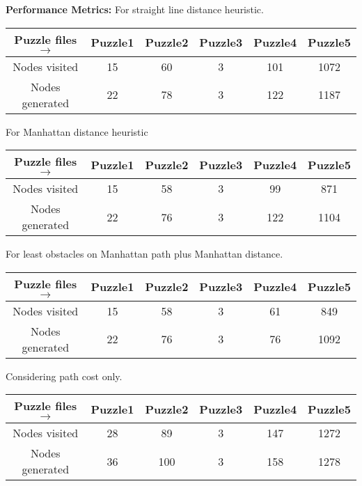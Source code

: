 \documentclass[12pt]{article}
\begin{document}
{\bf Performance Metrics:}
	\newline For straight line distance heuristic. \newline 
	\begin{tabular}{ | c | c | c | c | c | c | }
		\hline
			Puzzle files $\rightarrow$ & Puzzle1 & Puzzle2 & Puzzle3 & Puzzle4 & Puzzle5 \\ \hline
			Nodes visited &   15 & 60 & 3 & 101 & 1072 \\ \hline
			Nodes generated & 22 & 78 & 3 & 122 & 1187 \\ 
		\hline
	\end{tabular} \newline
	\newline For Manhattan distance heuristic \newline 
	\begin{tabular}{ | c | c | c | c | c | c | }
		\hline
			Puzzle files $\rightarrow$ & Puzzle1 & Puzzle2 & Puzzle3 & Puzzle4 & Puzzle5 \\ \hline
			Nodes visited &   15 & 58 & 3 & 99  & 871 \\ \hline
			Nodes generated & 22 & 76 & 3 & 122 & 1104 \\ 
		\hline
	\end{tabular} \newline
	\newline For least obstacles on Manhattan path plus Manhattan distance. \newline
	\begin{tabular}{ | c | c | c | c | c | c | }
		\hline
			Puzzle files $\rightarrow$ & Puzzle1 & Puzzle2 & Puzzle3 & Puzzle4 & Puzzle5 \\ \hline
			Nodes visited &   15 & 58 & 3 & 61 & 849 \\ \hline
			Nodes generated & 22 & 76 & 3 & 76 & 1092 \\
		\hline
	\end{tabular} \newline
	\newline Considering path cost only. \newline
	\begin{tabular}{ | c | c | c | c | c | c | }
		\hline
			Puzzle files $\rightarrow$ & Puzzle1 & Puzzle2 & Puzzle3 & Puzzle4 & Puzzle5 \\ \hline
			Nodes visited &   28 & 89  & 3 & 147 & 1272 \\ \hline
			Nodes generated & 36 & 100 & 3 & 158 & 1278 \\
		\hline
	\end{tabular} \newline
\end{document}
